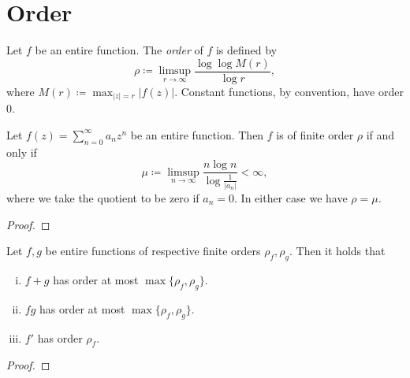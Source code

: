 \chapter{Order}
\label{ch:order}

\begin{definition}
    Let $f$ be an entire function. The \emph{order} of $f$ is defined by
    $$ \rho \coloneqq \limsup_{r \to \infty} \frac{\log \log M(r)}{\log r}, $$
    where $ M(r) \coloneqq \max_{\vert z \vert = r} \vert f(z) \vert $. Constant functions, by convention, have order 0.
\end{definition}

\begin{remark}
\end{remark}

\begin{theorem}
    Let $f(z) = \sum_{n=0}^\infty a_n z^n$ be an entire function. Then $f$ is of finite order $\rho$ if and only if
    $$ \mu \coloneqq \limsup_{n \to \infty} \frac{n \log n}{\log \frac{1}{\vert a_n \vert}} < \infty, $$
    where we take the quotient to be zero if $a_n = 0$. In either case we have $\rho = \mu$.
\end{theorem}

\begin{proof}
\end{proof}

\begin{example}
\end{example}

\begin{proposition}
    Let $f, g$ be entire functions of respective finite orders $\rho_f, \rho_g$. Then it holds that
    \begin{enumerate}[i.]
        \item $f + g$ has order at most $\max \{ \rho_f, \rho_g \}$.
        \item $fg$ has order at most $\max \{ \rho_f, \rho_g \}$.
        \item $f'$ has order $\rho_f$.
    \end{enumerate}
\end{proposition}

\begin{proof}
\end{proof}